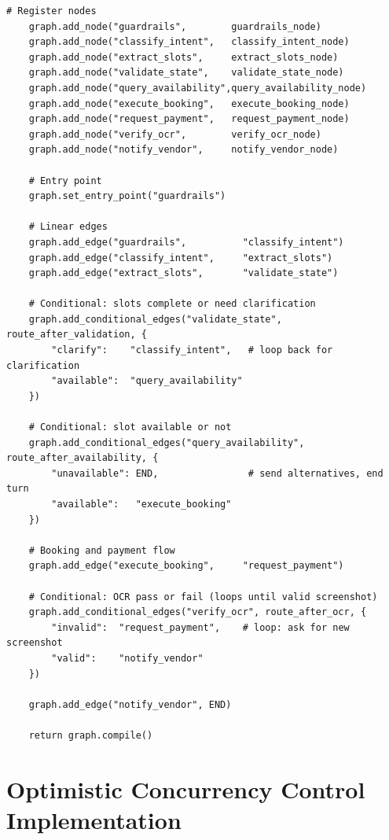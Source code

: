 \begin{lstlisting}[style=pythonstyle, caption={LangGraph agent state schema and graph construction (agent/graph.py).}]
    # Register nodes
    graph.add_node("guardrails",        guardrails_node)
    graph.add_node("classify_intent",   classify_intent_node)
    graph.add_node("extract_slots",     extract_slots_node)
    graph.add_node("validate_state",    validate_state_node)
    graph.add_node("query_availability",query_availability_node)
    graph.add_node("execute_booking",   execute_booking_node)
    graph.add_node("request_payment",   request_payment_node)
    graph.add_node("verify_ocr",        verify_ocr_node)
    graph.add_node("notify_vendor",     notify_vendor_node)

    # Entry point
    graph.set_entry_point("guardrails")

    # Linear edges
    graph.add_edge("guardrails",          "classify_intent")
    graph.add_edge("classify_intent",     "extract_slots")
    graph.add_edge("extract_slots",       "validate_state")

    # Conditional: slots complete or need clarification
    graph.add_conditional_edges("validate_state", route_after_validation, {
        "clarify":    "classify_intent",   # loop back for clarification
        "available":  "query_availability"
    })

    # Conditional: slot available or not
    graph.add_conditional_edges("query_availability", route_after_availability, {
        "unavailable": END,                # send alternatives, end turn
        "available":   "execute_booking"
    })

    # Booking and payment flow
    graph.add_edge("execute_booking",     "request_payment")

    # Conditional: OCR pass or fail (loops until valid screenshot)
    graph.add_conditional_edges("verify_ocr", route_after_ocr, {
        "invalid":  "request_payment",    # loop: ask for new screenshot
        "valid":    "notify_vendor"
    })

    graph.add_edge("notify_vendor", END)

    return graph.compile()
\end{lstlisting}

\section{Optimistic Concurrency Control Implementation}
\label{app:code-occ}

